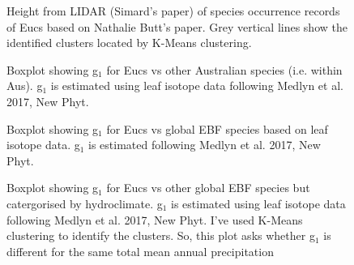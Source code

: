 \documentclass[12pt,a4paper,oneside]{article}
\begin{document}


\FloatBarrier

\begin{figure}[!hbtp]
\centering
{}
\caption{\small{Height from LIDAR (Simard's paper) of species occurrence records of Eucs based on Nathalie Butt's paper. Grey vertical lines show the identified clusters located by K-Means clustering.}}
\label{}
\end{figure}

\FloatBarrier

\begin{figure}[!hbtp]
\centering
{}
\caption{\small{Boxplot showing g$_1$ for Eucs vs other Australian species (i.e. within Aus). g$_1$ is estimated using leaf isotope data following Medlyn et al. 2017, New Phyt.}}
\label{}
\end{figure}

\FloatBarrier

\begin{figure}[!hbtp]
\centering
{}
\caption{\small{Boxplot showing g$_1$ for Eucs vs global EBF species based on leaf isotope data. g$_1$ is estimated following Medlyn et al. 2017, New Phyt.}}
\label{}
\end{figure}

\FloatBarrier

\begin{figure}[!hbtp]
\centering
{}
\caption{\small{Boxplot showing g$_1$ for Eucs vs other global EBF species but catergorised by hydroclimate. g$_1$ is estimated using leaf isotope data following Medlyn et al. 2017, New Phyt. I've used K-Means clustering to identify the clusters. So, this plot asks whether g$_1$ is different for the same total mean annual precipitation}}
\label{}
\end{figure}
\end{document}

